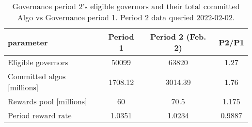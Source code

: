 %
\begin{longtable}[c]{ l c c c }
\caption{Governance period 2's eligible governors and their total committed Algo vs Governance period 1. Period 2 data queried 2022-02-02.} \\
\hline
\textbf{parameter} & \textbf{Period 1} & \textbf{Period 2 (Feb. 2)} & \textbf{P2/P1} \\
\hline

Eligible governors & 50099 & 63820 & 1.27 \\
Committed algos [millions] & 1708.12 & 3014.39 & 1.76 \\
Rewards pool [millions] & 60 & 70.5 & 1.175 \\
Period reward rate & 1.0351 & 1.0234 & 0.9887 \\
\hline
\end{longtable} 
